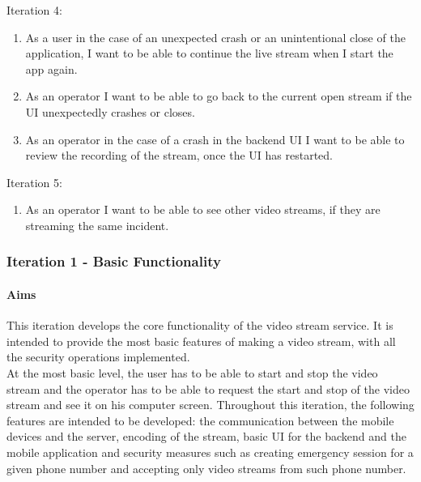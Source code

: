 \documentclass{article}
\begin{document}
	Iteration 4:
	\begin{enumerate}
	\item As a user in the case of an unexpected crash or an unintentional close of the application, I want to be able to continue the live stream when I start the app again.
\item As an operator I want to be able to go back to the current open stream if the UI unexpectedly crashes or closes.
\item As an operator in the case of a crash in the backend UI I want to be able to review the recording of the stream, once the UI has restarted.

	\end{enumerate}
	Iteration 5:
	\begin{enumerate}
	\item As an operator I want to be able to see other video streams, if they are streaming the same incident.
	\end{enumerate}
	\pagebreak
		\subsubsection{Iteration 1 - Basic Functionality}
			\paragraph{Aims}
			This iteration develops the core functionality of the video stream service. It is intended to provide the most basic features of making a video stream, with all the security operations implemented.\\

			At the most basic level, the user has to be able to start and stop the video stream and the operator has to be able to request the start and stop of the video stream and see it on his computer screen. Throughout this iteration, the following features are intended to be developed: the communication between the mobile devices and the server, encoding of the stream, basic UI for the backend and the mobile application and security measures such as creating emergency session for a given phone number and accepting only video streams from such phone number.
			
\end{document}
